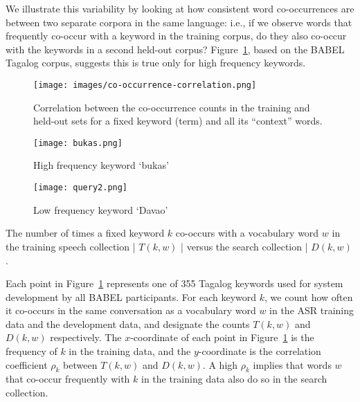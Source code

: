 \documentclass[11pt]{article}
\begin{document}
We illustrate this variability by looking at how consistent word co-occurrences are between two separate corpora in the same language: i.e., if we observe words that frequently co-occur with a keyword in the training corpus, do they also co-occur with the keywords in a second held-out corpus?  Figure~\ref{word-co-occur}, based on the {\small BABEL} Tagalog corpus, suggests this is true only for high frequency keywords. 

\begin{figure}[th]
\centering
\texttt{[image: images/co-occurrence-correlation.png]}
\begin{caption}{Correlation between the co-occurrence counts in the training and held-out sets for a fixed keyword (term) and all its ``context'' words.}
\label{word-co-occur}
\end{caption}
\end{figure}

\begin{figure*}[th]
\centering
\begin{subfigure}[b]{0.45\linewidth}
  \centering
  \texttt{[image: bukas.png]}
  \begin{caption}{High frequency keyword `bukas'}\end{caption}
\end{subfigure}	
\begin{subfigure}[b]{0.45\linewidth}
  \centering
  \texttt{[image: query2.png]}
  \begin{caption}{Low frequency keyword `Davao'}\end{caption}
\end{subfigure}
\begin{caption}{The number of times a fixed keyword $k$ co-occurs with a vocabulary word $w$ in the training speech collection | $T(k,w)$ | versus the search collection | $D(k,w)$.}
  \label{word-co-occur-ex}
\end{caption}
\end{figure*}

Each point in Figure~\ref{word-co-occur} represents one of 355 Tagalog keywords used for system development by all {\small BABEL} participants.  For each keyword $k$, we count how often it co-occurs in the same conversation as a vocabulary word $w$ in the ASR training data and the development data, and designate the counts $T(k,w)$ and $D(k,w)$ respectively.  The $x$-coordinate of each point in Figure~\ref{word-co-occur} is the frequency of $k$ in the training data, and the $y$-coordinate is the correlation coefficient $\rho_k$ between $T(k,w)$ and $D(k,w)$.  A high $\rho_k$ implies that words $w$ that co-occur frequently with $k$ in the training data also do so in the search collection.
\end{document}
